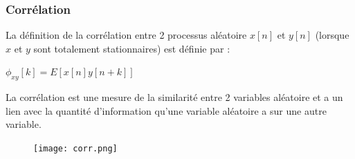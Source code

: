 \documentclass[conference,onecolumn]{IEEEtran}
\begin{document}
\subsubsection{Corrélation}
\medskip

La définition de la corrélation entre 2 processus aléatoire $x[n]$ et $y[n]$ (lorsque $x$ et $y$ sont totalement stationnaires) est définie par :
\medskip
\begin{center}
   $ \phi_{xy}[k]=E[x[n]y[n+k]]  $
   \medskip
\end{center}
La corrélation est une mesure de la similarité entre 2 variables aléatoire et a un lien avec la quantité d’information qu’une variable aléatoire a sur une autre variable.
\medskip
\begin{figure}[H]
 \centering
    \texttt{[image: corr.png]}
\end{figure}
\end{document}
